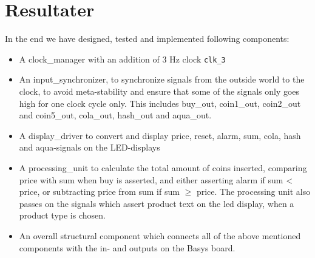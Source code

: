 \newpage
\chapter{Resultater}

In the end we have designed, tested and implemented following components:

\begin{itemize}
\item A clock\_manager with an addition of 3 Hz clock \texttt{clk\_3} 
\item An input\_synchronizer, to synchronize signals from the outside world to the clock, to avoid meta-stability and ensure that some of the signals only goes high for one clock cycle only. This includes buy\_out, coin1\_out, coin2\_out and coin5\_out, cola\_out, hash\_out and aqua\_out.
\item A display\_driver to convert and display price, reset, alarm, sum, cola, hash and aqua-signals on the LED-displays
\item A processing\_unit to calculate the total amount of coins inserted, comparing price with sum when buy is asserted, and either asserting alarm if sum < price, or subtracting price from sum if sum $\geq$ price. The processing unit also passes on the signals which assert product text on the led display, when a product type is chosen.
\item An overall structural component which connects all of the above mentioned components with the in- and outputs on the Basys board.
\end{itemize}













